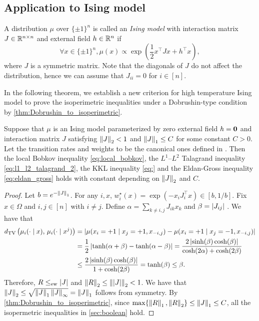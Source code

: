 \subsection{Application to Ising model}
A distribution $\mu$ over $\{\pm 1\}^n$ is called an \emph{Ising model} with interaction matrix $J \in \mathbb{R}^{n\times n}$ and external field $h\in \mathbb{R}^n$ if 
$$
    \forall x\in \{\pm 1\}^n, \mu(x) \propto \exp(\frac 12 x^\top J x + h^\top x),
$$
where $J$ is a symmetric matrix.
Note that the diagonals of $J$ do not affect the distribution, hence we can assume that $J_{ii} = 0$ for $i\in[n]$.

In the following theorem, we establish a new criterion for high temperature Ising model to prove the isoperimetric inequalities under a Dobrushin-type condition by \cref{thm:Dobrushin_to_isoperimetric}.
\begin{theorem}\label{thm:Ising}
    Suppose that $\mu$ is an Ising model parameterized by zero external field $h = \boldsymbol{0}$ and interaction matrix $J$ satisfying $\left\lVert J \right\rVert_2 < 1$ and $\left\lVert J \right\rVert_1\leq C$ for some constant $C > 0$.
    Let the transition rates and weights to be the canonical ones defined in .
    Then the local Bobkov inequality \eqref{eq:local_bobkov}, the $L^1$--$L^2$ Talagrand inequality \eqref{eq:l1_l2_talagrand_2}, the KKL inequality \eqref{eq:} and the Eldan-Gross inequality \eqref{eq:eldan_gross} holds with constant depending on $\left\lVert J \right\rVert_2$ and $C$.
\end{theorem}


\begin{proof}
    Let $b = e^{-\left\lVert J \right\rVert_1}$.
    For any $i,x$, $w_i^\star(x) = \exp(-x_iJ_i^\top x) \in [b,1/b]$.
    Fix $x\in \Omega$ and $i,j\in [n]$ with $i\neq j$.
    Define $\alpha = \sum_{k\neq i,j}J_{ik} x_k$ and $\beta = \left\vert J_{ij}\right\vert$ .
    We have that 
    \begin{align*}
        d_{\mathrm{TV}}\left({\mu_i(\cdot\mid x)},\,{\mu_i(\cdot\mid x^j)}\right) &= \left\vert\mu(x_i=+1\mid x_j=+1,x_{-i,j}) - \mu(x_i=+1\mid x_j=-1,x_{-i,j})\right\vert
        \\&= \frac 12\left\vert\tanh(\alpha+\beta) - \tanh(\alpha-\beta)\right\vert
        = \frac{2\left\vert\sinh(\beta)\cosh(\beta)\right\vert}{\cosh(2\alpha)+\cosh(2\beta)}
        \\&\leq \frac{2\left\vert\sinh(\beta)\cosh(\beta)\right\vert}{1+\cosh(2\beta)} = \tanh(\beta) \leq \beta.
    \end{align*}
    Therefore, $R \leq_{\mathrm{ew}} \left\vert J\right\vert$ and $\left\lVert R \right\rVert_2\leq \left\lVert \left\vert J\right\vert \right\rVert_2 < 1$.
    We have that $\left\lVert J \right\rVert_2 \leq \sqrt{\left\lVert J \right\rVert_1\left\lVert J \right\rVert_{\infty}} = \left\lVert J \right\rVert_1$ follows from symmetry. 
    By \cref{thm:Dobrushin_to_isoperimetric}, since $\max\{\left\lVert R \right\rVert_1,\left\lVert R \right\rVert_2\}\leq \left\lVert J \right\rVert_1 \leq C$, all the isopermetric inequalities in \cref{sec:boolean} hold.
\end{proof}



